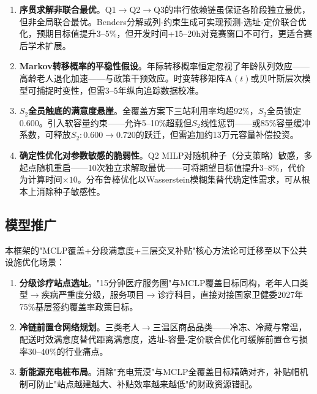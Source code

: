 \begin{enumerate}[label=\textbf{局限\arabic*：}, leftmargin=*, itemsep=4pt]

    \item \textbf{序贯求解非联合最优}。Q1$\to$Q2$\to$Q3的串行依赖链虽保证各阶段独立最优，但非全局联合最优。Benders分解或列-约束生成可实现预测-选址-定价联合优化，预期目标值提升3--5\%，但开发时间+15--20h对竞赛窗口不可行，更适合赛后学术扩展。

    \item \textbf{Markov转移概率的平稳性假设}。年际转移概率恒定忽视了年龄队列效应——高龄老人退化加速——与政策干预效应。时变转移矩阵$\mathbf{A}(t)$或贝叶斯层次模型可捕捉时变性，但需3--5年纵向追踪数据校准。

    \item \textbf{$S_2$全员触底的满意度悬崖}。全覆盖方案下三站利用率均超92\%，$S_2$全员锁定0.600。引入软容量约束——允许5--10\%超载但$S_2$线性惩罚——或85\%容量缓冲系数，可释放$S_2:0.600\to0.720$的跃迁，但需追加约13万元容量补偿投资。

    \item \textbf{确定性优化对参数敏感的脆弱性}。Q2 MILP对随机种子（分支策略）敏感，多起点随机重启——10次独立求解取最优——可将期望目标值提升3--8\%，代价为计算时间$\times 10$。分布鲁棒优化以Wasserstein模糊集替代确定性需求，可从根本上消除种子敏感性。

\end{enumerate}

\subsection{模型推广}

本框架的"MCLP覆盖+分段满意度+三层交叉补贴"核心方法论可迁移至以下公共设施优化场景：

\begin{enumerate}[label=\textbf{(\arabic*)}, leftmargin=*, itemsep=3pt]
    \item \textbf{分级诊疗站点选址}。"15分钟医疗服务圈"与MCLP覆盖目标同构，老年人口类型$\to$疾病严重度分级，服务项目$\to$诊疗科目，直接对接国家卫健委2027年75\%基层签约覆盖率政策目标。
    \item \textbf{冷链前置仓网络规划}。三类老人$\to$三温区商品品类——冷冻、冷藏与常温，配送时效满意度替代距离满意度，选址-容量-定价联合优化可缓解前置仓亏损率30--40\%的行业痛点。
    \item \textbf{新能源充电桩布局}。消除"充电荒漠"与MCLP全覆盖目标精确对齐，补贴帽机制可防止"站点越建越大、补贴效率越来越低"的财政资源错配。
\end{enumerate}
